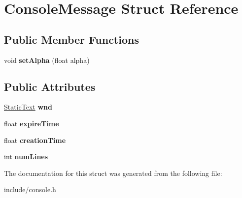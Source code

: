 \hypertarget{structConsoleMessage}{
\section{\-Console\-Message \-Struct \-Reference}
\label{dc/de1/structConsoleMessage}
}
\subsection*{\-Public \-Member \-Functions}
\begin{DoxyCompactItemize}
\item 
\hypertarget{structConsoleMessage_a20634e40142e9b07cb4e1ee42a7d3f2b}{
void {\bfseries set\-Alpha} (float alpha)}
\label{dc/de1/structConsoleMessage_a20634e40142e9b07cb4e1ee42a7d3f2b}

\end{DoxyCompactItemize}
\subsection*{\-Public \-Attributes}
\begin{DoxyCompactItemize}
\item 
\hypertarget{structConsoleMessage_ad967151e81a1ad2e879a7978c9345290}{
\hyperlink{classStaticText}{\-Static\-Text} {\bfseries wnd}}
\label{dc/de1/structConsoleMessage_ad967151e81a1ad2e879a7978c9345290}

\item 
\hypertarget{structConsoleMessage_ae0355f560188bf8f0d269f6db1f7326a}{
float {\bfseries expire\-Time}}
\label{dc/de1/structConsoleMessage_ae0355f560188bf8f0d269f6db1f7326a}

\item 
\hypertarget{structConsoleMessage_a60eb1a7119cc4bc8e8167e9b3486c0fd}{
float {\bfseries creation\-Time}}
\label{dc/de1/structConsoleMessage_a60eb1a7119cc4bc8e8167e9b3486c0fd}

\item 
\hypertarget{structConsoleMessage_a34b25463dab53d1a13dbbeb88b21774b}{
int {\bfseries num\-Lines}}
\label{dc/de1/structConsoleMessage_a34b25463dab53d1a13dbbeb88b21774b}

\end{DoxyCompactItemize}


\-The documentation for this struct was generated from the following file\-:\begin{DoxyCompactItemize}
\item 
include/console.\-h\end{DoxyCompactItemize}
